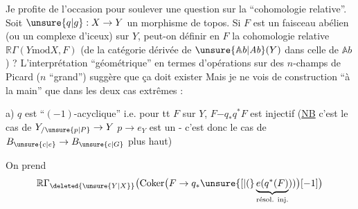 
Je profite de l'occasion pour soulever une question sur la ``cohomologie relative''. Soit $\unsure{q|g}:X\to Y$ un morphisme de topos. Si $F$ est un faisceau abélien (ou un complexe d'iceux) sur $Y$, peut-on définir  en $F$ la cohomologie relative $\mathbb R\Gamma(Y\mathbin{\mathrm{mod}}X,F)$ (de la catégorie dérivée de $\unsure{\mathbb{A}b|\mathit{Ab}}(Y)$ dans celle de $\mathbb{A}b$) ? L'interprétation ``géométrique'' en termes d'opérations sur des $n$-champs de Picard ($n$ ``grand'') suggère que ça doit exister
Mais je ne vois de construction  ``à la main'' que dans les deux cas extrêmes :

a) $q$ est ``$(-1)$-acyclique'' i.e. pour tt $F$ sur $Y$, $F\mathord{-}q_{*}q^{*}F$ est injectif (\uline{NB} c'est le cas de $Y_{/\unsure{p|P}}\to Y$  $p\to e_{Y}$ est un  - c'est donc le cas de $B_{\unsure{c|e}}\to B_{\unsure{c|G}}$ plus haut)

On prend
\[
\mathbb R\Gamma_{\deleted{\unsure{Y|X}}}\bigl(\operatorname{Coker}\bigl(F\to q_{*}\unsure{[|(}\underbrace{e(q^{*}(F)}_{\text{résol. inj.}}))\bigr)[-1]\bigr)
\]
